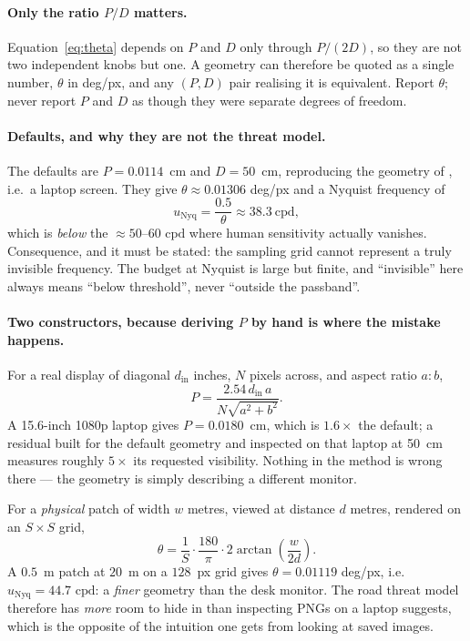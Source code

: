 \documentclass[11pt,a4paper]{article}
\newcommand{\cpd}{\mathrm{cpd}}
\begin{document}
\paragraph{Only the ratio $P/D$ matters.}
Equation~\eqref{eq:theta} depends on $P$ and $D$ only through $P/(2D)$, so
they are not two independent knobs but one. A geometry can therefore be
quoted as a single number, $\theta$ in deg/px, and any $(P,D)$ pair
realising it is equivalent. Report $\theta$; never report $P$ and $D$ as
though they were separate degrees of freedom.

\paragraph{Defaults, and why they are not the threat model.}
The defaults are $P=0.0114$~cm and $D=50$~cm, reproducing the geometry of
\citet[App.~D]{galinska2026csflow}, i.e.\ a laptop screen. They give
$\theta\approx0.01306$ deg/px and a Nyquist frequency of
\begin{equation}
  u_{\mathrm{Nyq}} = \frac{0.5}{\theta} \approx 38.3\ \cpd ,
  \label{eq:nyquist}
\end{equation}
which is \emph{below} the $\approx50$--$60$ $\cpd$ where human sensitivity
actually vanishes. Consequence, and it must be stated: the sampling grid
cannot represent a truly invisible frequency. The budget at Nyquist is large
but finite, and ``invisible'' here always means ``below threshold'', never
``outside the passband''.

\paragraph{Two constructors, because deriving $P$ by hand is where the
mistake happens.} For a real display of diagonal $d_{\mathrm{in}}$ inches,
$N$ pixels across, and aspect ratio $a{:}b$,
\begin{equation}
  P = \frac{2.54\, d_{\mathrm{in}}\, a}{N\sqrt{a^2+b^2}} .
  \label{eq:fromscreen}
\end{equation}
A 15.6-inch 1080p laptop gives $P=0.0180$~cm, which is $1.6\times$ the
default; a residual built for the default geometry and inspected on that
laptop at 50~cm measures roughly $5\times$ its requested visibility. Nothing
in the method is wrong there --- the geometry is simply describing a
different monitor.

For a \emph{physical} patch of width $w$ metres, viewed at distance $d$
metres, rendered on an $S\times S$ grid,
\begin{equation}
  \theta = \frac{1}{S}\cdot\frac{180}{\pi}\cdot
           2\arctan\!\left(\frac{w}{2d}\right).
  \label{eq:fromphysical}
\end{equation}
A $0.5$~m patch at $20$~m on a $128$~px grid gives $\theta=0.01119$ deg/px,
i.e.\ $u_{\mathrm{Nyq}}=44.7$ $\cpd$: a \emph{finer} geometry than the desk
monitor. The road threat model therefore has \emph{more} room to hide in
than inspecting PNGs on a laptop suggests, which is the opposite of the
intuition one gets from looking at saved images.
\end{document}
